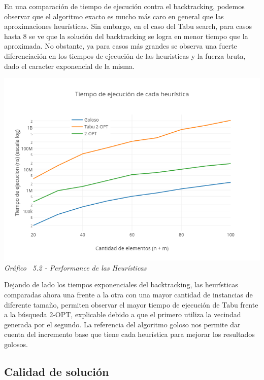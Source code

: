 En una comparación de tiempo de ejecución contra el backtracking, podemos observar que el algoritmo exacto es mucho más caro en general que las aproximaciones heurísticas. Sin embargo, en el caso del Tabu search, para casos hasta 8 se ve que la solución del backtracking se logra en menor tiempo que la aproximada. No obstante, ya para casos más grandes se observa una fuerte diferenciación en los tiempos de ejecución de las heuristicas y la fuerza bruta, dado el caracter exponencial de la misma.

\vspace*{0.3cm} \vspace*{0.3cm}
  \begin{center}
 \includegraphics[scale=0.5]{./EJ5/medicion.png}\\
 {\textit{Gráfico \ 5.2 - Performance de las Heur\'isticas}}
  \end{center}
  \vspace*{0.3cm}


Dejando de lado los tiempos exponenciales del backtracking, las heurísticas comparadas ahora una frente a la otra con una mayor cantidad de instancias de diferente tamaño, permiten observar el mayor tiempo de ejecución de Tabu frente a la búsqueda 2-OPT, explicable debido a que el primero utiliza la vecindad generada por el segundo. La referencia del algoritmo goloso nos permite dar cuenta del incremento base que tiene cada heurística para mejorar los resultados golosos.

\subsection{Calidad de solución}


